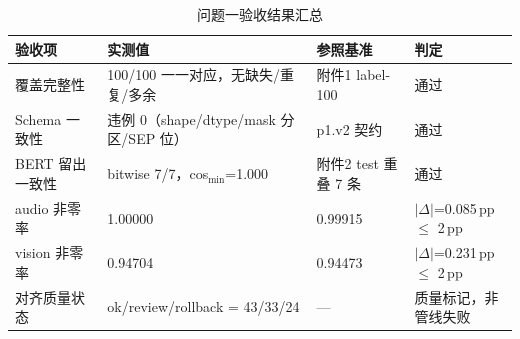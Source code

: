 \begin{table}[htbp]
  \centering\small
  \caption{问题一验收结果汇总}
  \label{tab:q1-acceptance}
  \begin{tabularx}{\linewidth}{@{}p{2.8cm}p{5.6cm}p{3.8cm}X@{}}
    \toprule
    验收项 & 实测值 & 参照基准 & 判定 \\
    \midrule
    覆盖完整性 & 100/100 一一对应，无缺失/重复/多余 & 附件1 label-100 & 通过 \\
    Schema 一致性 & 违例 0（shape/dtype/mask 分区/SEP 位） & p1.v2 契约 & 通过 \\
    BERT 留出一致性 & bitwise 7/7，cos$_{\min}$=1.000 & 附件2 test 重叠 7 条 & 通过 \\
    audio 非零率 & 1.00000 & 0.99915 & $|\Delta|$=0.085\,pp $\le$ 2\,pp \\
    vision 非零率 & 0.94704 & 0.94473 & $|\Delta|$=0.231\,pp $\le$ 2\,pp \\
    对齐质量状态 & ok/review/rollback = 43/33/24 & — & 质量标记，非管线失败 \\
    \bottomrule
  \end{tabularx}
  \par \smallskip
  \end{table}
